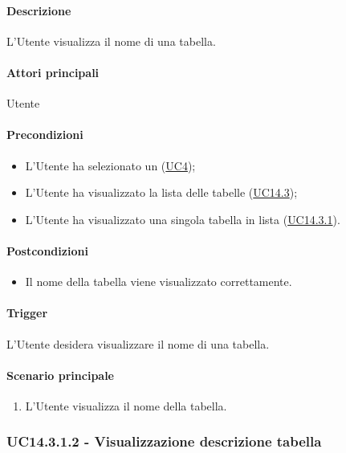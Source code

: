 \paragraph*{Descrizione}
L'Utente visualizza il nome di una tabella.

\paragraph*{Attori principali}
Utente

\paragraph*{Precondizioni}
\begin{itemize}
  \item L'Utente ha selezionato un  (\hyperref[UC4]{UC4});
  \item L'Utente ha visualizzato la lista delle tabelle (\hyperref[UC14point3]{UC14.3});
  \item L'Utente ha visualizzato una singola tabella in lista (\hyperref[UC14point3point1]{UC14.3.1}).
\end{itemize}

\paragraph*{Postcondizioni}
\begin{itemize}
  \item Il nome della tabella viene visualizzato correttamente.
\end{itemize}

\paragraph*{Trigger}
L'Utente desidera visualizzare il nome di una tabella.

\paragraph*{Scenario principale}
\begin{enumerate}
  \item L'Utente visualizza il nome della tabella.
\end{enumerate}


\subsubsection{UC14.3.1.2 - Visualizzazione descrizione tabella}\label{UC14point3point1point2}
